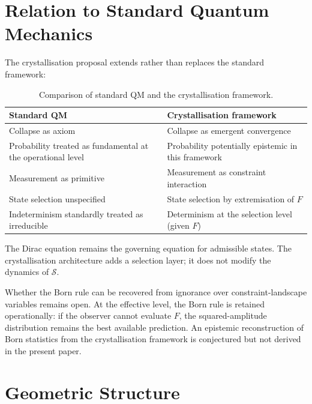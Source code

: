 \documentclass[12pt]{article}
\begin{document}
\section{Relation to Standard Quantum Mechanics}\label{sec:relation}

The crystallisation proposal extends rather than replaces the standard framework:

\begin{table}[ht]
\centering
\caption{Comparison of standard QM and the crystallisation framework.}
\label{tab:comparison}
\begin{tabular}{@{}ll@{}}
\toprule
Standard QM & Crystallisation framework \\
\midrule
Collapse as axiom & Collapse as emergent convergence \\
Probability treated as fundamental at the operational level & Probability potentially epistemic in this framework \\
Measurement as primitive & Measurement as constraint interaction \\
State selection unspecified & State selection by extremisation of $F$ \\
Indeterminism standardly treated as irreducible & Determinism at the selection level (given $F$) \\
\bottomrule
\end{tabular}
\end{table}

The Dirac equation remains the governing equation for admissible states. The crystallisation architecture adds a selection layer; it does not modify the dynamics of $\mathcal{S}$.

Whether the Born rule can be recovered from ignorance over constraint-landscape variables remains open. At the effective level, the Born rule is retained operationally: if the observer cannot evaluate $F$, the squared-amplitude distribution remains the best available prediction. An epistemic reconstruction of Born statistics from the crystallisation framework is conjectured but not derived in the present paper.

\section{Geometric Structure}\label{sec:geometry}
\end{document}
